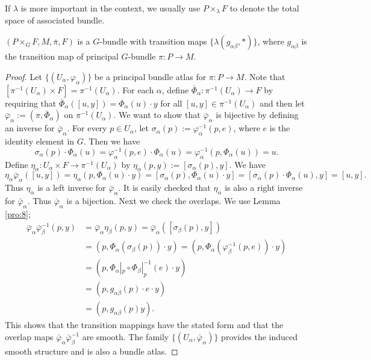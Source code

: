 If $\lambda$ is more important in the context, we usually use $P\times_\lambda F$ to denote the total space of associated bundle.

\begin{lem}
	$(P\times_G F,M,\bar{\pi},F)$ is a $G$-bundle with transition maps $\{\lambda(g_{\alpha\beta},*)\}$, where $g_{\alpha\beta}$ is the transition map of principal $G$-bundle $\pi:P\to M$.
\end{lem}

\begin{proof}
	Let $\{(U_\alpha,\varphi_\alpha)\}$ be a principal bundle atlas for $\pi:P\to M$. Note that $[\pi^{-1}(U_\alpha)\times F]=\pi^{-1}(U_\alpha)$. For each $\alpha$, define $\bar{\Phi}_\alpha:\pi^{-1}(U_\alpha)\to F$ by requiring that $\bar{\Phi}_\alpha([u,y])=\Phi_\alpha(u)\cdot y$ for all $[u,y]\in \pi^{-1}(U_\alpha)$ and then let $\bar{\varphi}_\alpha:=(\pi,\bar{\Phi}_\alpha)$ on $\pi^{-1}(U_\alpha)$. We want to show that $\bar{\varphi}_\alpha$ is bijective by defining an inverse for $\bar{\varphi}_\alpha$. For every $p\in U_\alpha$, let $\sigma_\alpha(p):=\varphi_\alpha^{-1}(p,e)$, where $e$ is the identity element in $G$. Then we have
	\[
	\sigma_\alpha(p) \cdot \Phi_\alpha(u)=\varphi_\alpha^{-1}(p,e)\cdot \Phi_\alpha(u)=\varphi_\alpha^{-1}(p,\Phi_\alpha(u))=u.
	\]
	Define $\eta_\alpha:U_\alpha\times F\to \pi^{-1}(U_\alpha)$ by $\eta_{\alpha}(p,y):=[\sigma_\alpha(p),y]$. We have
	\[
	\eta_\alpha\bar{\varphi}_\alpha([u,y])=\eta_\alpha(p,\Phi_\alpha(u)\cdot y)=[\sigma_\alpha(p),\Phi_\alpha(u)\cdot y]=[\sigma_\alpha(p)\cdot \Phi_\alpha(u),y]=[u,y].
	\]
	Thus $\eta_\alpha$ is a left inverse for $\bar{\varphi}_{\alpha}$. It is easily checked that $\eta_\alpha$ is also a right inverse for $\bar{\varphi}_{\alpha}$. Thus $\bar{\varphi}_\alpha$ is a bijection. Next we check the overlaps. We use Lemma \ref{pro:8};
	\[
	\begin{aligned}
	\bar{\varphi}_{\alpha}\bar{\varphi}_{\beta}^{-1}(p,y)&=\bar{\varphi}_{\alpha}\eta_\beta(p,y)=\bar{\varphi}_{\alpha}([\sigma_\beta(p),y])\\
	&=(p,\Phi_\alpha(\sigma_\beta(p))\cdot y)=(p,\Phi_\alpha(\varphi_\beta^{-1}(p,e))\cdot y)\\
	&=(p,\Phi_\alpha|_p\circ \Phi_\beta|_p^{-1}(e)\cdot y)\\
	&=(p,g_{\alpha\beta}(p)\cdot e\cdot y)\\
	&=(p,g_{\alpha\beta}(p)y).
	\end{aligned}
	\]
	This shows that the transition mappings  have the stated form and that the overlap maps $\bar{\varphi}_{\alpha}\bar{\varphi}_{\beta}^{-1}$ are smooth. The family $\{(U_\alpha,\bar{\varphi}_\alpha)\}$ provides the induced smooth structure and is also a bundle atlas.
\end{proof}

